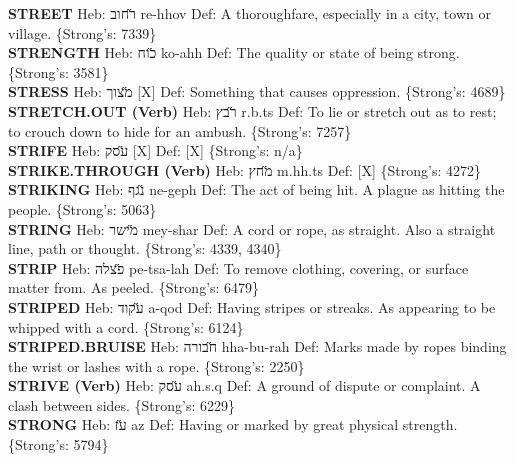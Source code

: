 {\textbf{STREET} Heb: {\large\H רחוב} re-hhov Def: A thoroughfare, especially in a city, town or village. \{Strong's: 7339\}\hfill{}\\

\textbf{STRENGTH} Heb: {\large\H כוח} ko-ahh Def: The quality or state of being strong. \{Strong's: 3581\}\hfill{}\\

\textbf{STRESS} Heb: {\large\H מצוך} {[}X{]} Def: Something that causes oppression. \{Strong's: 4689\}\hfill{}\\

\textbf{STRETCH.OUT (Verb)} Heb: {\large\H רבץ} r.b.ts Def: To lie or stretch out as to rest; to crouch down to hide for an ambush. \{Strong's: 7257\}\hfill{}\\

\textbf{STRIFE} Heb: {\large\H עסק} {[}X{]} Def: {[}X{]} \{Strong's: n/a\}\hfill{}\\

\textbf{STRIKE.THROUGH (Verb)} Heb: {\large\H מחץ} m.hh.ts Def: {[}X{]} \{Strong's: 4272\}\hfill{}\\

\textbf{STRIKING} Heb: {\large\H נגף} ne-geph Def: The act of being hit. A plague as hitting the people. \{Strong's: 5063\}\hfill{}\\

\textbf{STRING} Heb: {\large\H מישר} mey-shar Def: A cord or rope, as straight. Also a straight line, path or thought. \{Strong's: 4339, 4340\}\hfill{}\\

\textbf{STRIP} Heb: {\large\H פצלה} pe-tsa-lah Def: To remove clothing, covering, or surface matter from. As peeled. \{Strong's: 6479\}\hfill{}\\

\textbf{STRIPED} Heb: {\large\H עקוד} a-qod Def: Having stripes or streaks. As appearing to be whipped with a cord. \{Strong's: 6124\}\hfill{}\\

\textbf{STRIPED.BRUISE} Heb: {\large\H חבורה} hha-bu-rah Def: Marks made by ropes binding the wrist or lashes with a rope. \{Strong's: 2250\}\hfill{}\\

\textbf{STRIVE (Verb)} Heb: {\large\H עסק} ah.s.q Def: A ground of dispute or complaint. A clash between sides. \{Strong's: 6229\}\hfill{}\\

\textbf{STRONG} Heb: {\large\H עז} az Def: Having or marked by great physical strength. \{Strong's: 5794\}\hfill{}\\

}
